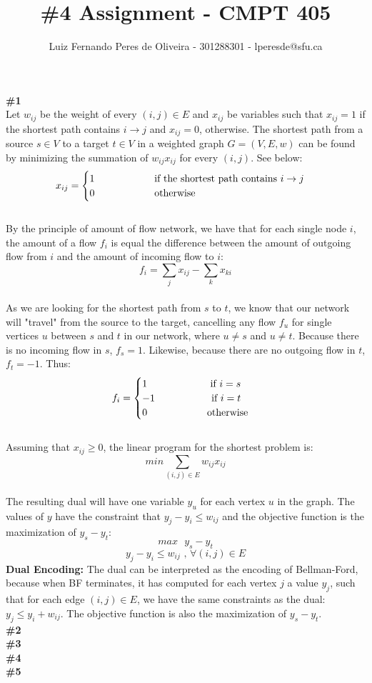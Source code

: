 \documentclass{article}
\title{\#4 Assignment - CMPT 405}
\author{Luiz Fernando Peres de Oliveira - 301288301 - lperesde@sfu.ca}
\newcommand\tab[1][1cm]{\hspace*{#1}}
\begin{document}
\maketitle
\textbf{\#1}
\\
Let $w_{ij}$ be the weight of every $(i, j) \in E$ and $x_{ij}$ be variables such that $x_{ij} = 1$ if the shortest path contains $i \rightarrow j$ and $x_{ij} = 0$, otherwise. The shortest path from a source $s \in V$ to a target $t \in V$ in a weighted graph $G=(V, E, \textit{w})$ can be found by minimizing the summation of $w_{ij}x_{ij}$ for every $(i, j)$. See below:
\begin{gather*}
x_{ij} =
\begin{cases}
1 \tab\tab\text{ if the shortest path contains } i \rightarrow j \\
0 \tab\tab\text{ otherwise}\\
\end{cases}
\end{gather*}
\\
By the principle of amount of flow network, we have that for each single node $i$, the amount of a flow $f_i$ is equal the difference between the amount of outgoing flow from $i$ and the amount of incoming flow to $i$:
$$
f_i = \sum_{j}x_{ij} - \sum_{k} x_{ki}
$$
\\
As we are looking for the shortest path from $s$ to $t$, we know that our network will "travel" from the source to the target, cancelling any flow $f_u$ for single vertices $u$ between $s$ and $t$ in our network, where $u \neq s$ and $u \neq t$. Because there is no incoming flow in $s$, $f_s = 1$. Likewise, because there are no outgoing flow in $t$, $f_t = -1$. Thus:
\begin{gather*}
f_i =
\begin{cases}
1 \text{ } \tab\tab\text{ if } i = s\\
-1 \tab\tab\text{if } i = t\\
0 \tab\tab\text{ otherwise}
\end{cases}
\end{gather*}
\\
Assuming that $x_{ij} \geq 0$, the linear program for the shortest problem is:
$$
min \sum_{(i, j) \in E} w_{ij}x_{ij}
$$
\\
The resulting dual will have one variable $y_u$ for each vertex $u$ in the  graph. The values of $y$ have the constraint that $y_j - y_i \leq w_{ij}$ and the objective function is the maximization of $y_s - y_t$:
$$
max \text{ } y_s - y_t
$$
$$
y_j - y_i \leq w_{ij} \text{ , } \forall (i,j) \in E
$$
\textbf{Dual Encoding:}
The dual can be interpreted as the encoding of Bellman-Ford, because when BF terminates, it has computed for each vertex $j$ a value $y_j$, such that for each edge $(i,j) \in E$, we have the same constraints as the dual: $y_j \leq y_i + w_{ij}$. The objective function is also the maximization of $y_s - y_t$.
\\
\textbf{\#2}
\\
\textbf{\#3}
\\
\textbf{\#4}
\\
\textbf{\#5}
\\
\end{document}
